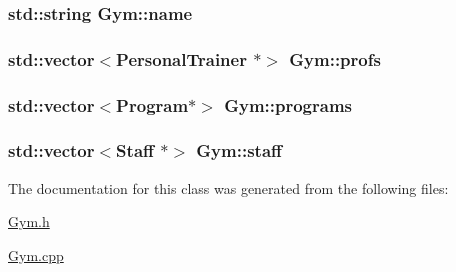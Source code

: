 \subsubsection[{\texorpdfstring{name}{name}}]{\setlength{\rightskip}{0pt plus 5cm}std\+::string Gym\+::name\hspace{0.3cm}{\ttfamily [private]}}\hypertarget{classGym_a56d26a68f26527592d516348383aed25}{}\label{classGym_a56d26a68f26527592d516348383aed25}
\subsubsection[{\texorpdfstring{profs}{profs}}]{\setlength{\rightskip}{0pt plus 5cm}std\+::vector$<${\bf Personal\+Trainer} $\ast$$>$ Gym\+::profs\hspace{0.3cm}{\ttfamily [private]}}\hypertarget{classGym_afc05320302a5dac7d3b2cb4dfbe42371}{}\label{classGym_afc05320302a5dac7d3b2cb4dfbe42371}
\subsubsection[{\texorpdfstring{programs}{programs}}]{\setlength{\rightskip}{0pt plus 5cm}std\+::vector$<${\bf Program}$\ast$$>$ Gym\+::programs\hspace{0.3cm}{\ttfamily [private]}}\hypertarget{classGym_aeeff90e89fb7b1710886cbf85fc477de}{}\label{classGym_aeeff90e89fb7b1710886cbf85fc477de}
\subsubsection[{\texorpdfstring{staff}{staff}}]{\setlength{\rightskip}{0pt plus 5cm}std\+::vector$<${\bf Staff} $\ast$$>$ Gym\+::staff\hspace{0.3cm}{\ttfamily [private]}}\hypertarget{classGym_a9108e2c97ee58a50e491461559aa12fe}{}\label{classGym_a9108e2c97ee58a50e491461559aa12fe}


The documentation for this class was generated from the following files\+:\begin{DoxyCompactItemize}
\item 
\hyperlink{Gym_8h}{Gym.\+h}\item 
\hyperlink{Gym_8cpp}{Gym.\+cpp}\end{DoxyCompactItemize}
